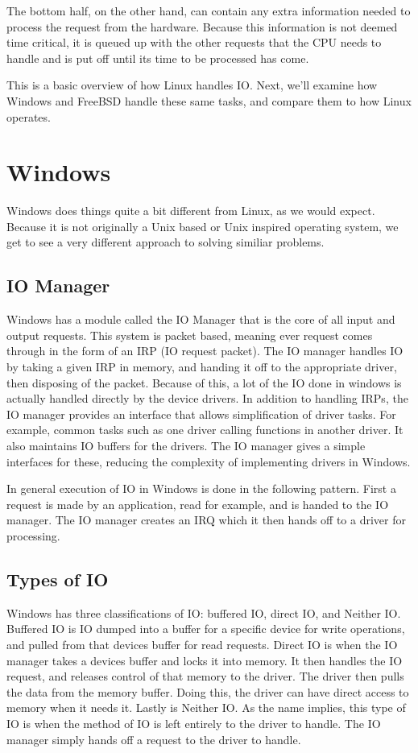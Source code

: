 \documentclass[10pt,letterpaper,onecolumn,draftclsnofoot]{IEEEtran}
\begin{document}
  The bottom half, on the other hand, can contain any extra information needed
  to process the request from the hardware. Because this information is not deemed
  time critical, it is queued up with the other requests that the CPU needs to handle
  and is put off until its time to be processed has come. \cite{robertlove2010}



  This is a basic overview of how Linux handles IO. Next, we'll examine how Windows
  and FreeBSD handle these same tasks, and compare them to how Linux operates.

\section{Windows}
Windows does things quite a bit different from Linux, as we would expect. Because
it is not originally a Unix based or Unix inspired operating system, we get to
see a very different approach to solving similiar problems.
 \subsection{IO Manager}
 Windows has a module called the IO Manager that is the core of all input and output
 requests. This system is packet based, meaning ever request comes through in the
 form of an IRP (IO request packet). The IO manager handles IO by taking a given
 IRP in memory, and handing it off to the appropriate driver, then disposing of
 the packet. Because of this, a lot of the IO done in windows is actually handled
 directly by the device drivers. In addition to handling IRPs, the IO manager
 provides an interface that allows simplification of driver tasks. For example,
 common tasks such as one driver calling functions in another driver. It also
 maintains IO buffers for the drivers. The IO manager gives a simple interfaces
 for these, reducing the complexity of implementing drivers in Windows.

 In general execution of IO in Windows is done in the following pattern. First
 a request is made by an application, read for example, and is handed to the IO
 manager. The IO manager creates an IRQ which it then hands off to a driver for
 processing.
 \cite{internals2}
 \subsection{Types of IO}
 Windows has three classifications of IO: buffered IO, direct IO, and Neither IO.
 Buffered IO is IO dumped into a buffer for a specific device for write operations,
 and pulled from that devices buffer for read requests. Direct IO is when the IO
 manager takes a devices buffer and locks it into memory. It then handles the IO
 request, and releases control of that memory to the driver. The driver then pulls
 the data from the memory buffer. Doing this, the driver can have direct access
 to memory when it needs it. Lastly is Neither IO. As the name implies, this type
 of IO is when the method of IO is left entirely to the driver to handle. The IO
 manager simply hands off a request to the driver to handle.\cite{internals2}
\end{document}
